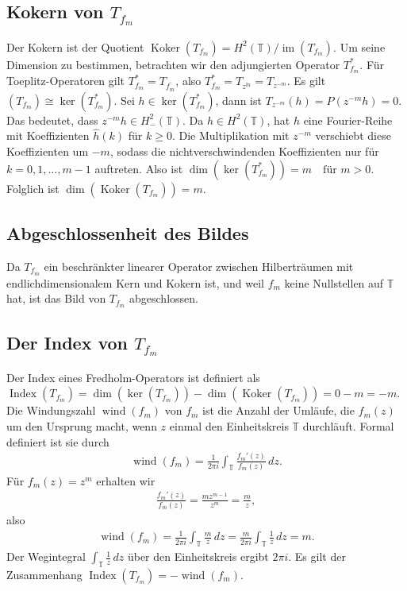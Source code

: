 \documentclass[11pt, hidelinks]{article}
\numberwithin{conj}{section}
\begin{document}
\subsection{Kokern von \( T_{f_m} \)}
Der Kokern ist der Quotient $\operatorname{Koker}(T_{f_m}) = H^2(\mathbb{T}) / \operatorname{im}(T_{f_m})$. Um seine Dimension zu bestimmen, betrachten wir den adjungierten Operator \( T_{f_m}^* \). Für Toeplitz-Operatoren gilt \( T_{f_m}^* = T_{\overline{f_m}} \), also $T_{f_m}^* = T_{\overline{z^m}} = T_{z^{-m}}$. Es gilt $(T_{f_m}) \cong \ker(T_{f_m}^*)$. Sei \( h \in \ker(T_{f_m}^*) \), dann ist $T_{z^{-m}}(h) = P(z^{-m} h) = 0$. Das bedeutet, dass \( z^{-m} h \in H^2_-(\mathbb{T}) \). Da \( h \in H^2(\mathbb{T}) \), hat \( h \) eine Fourier-Reihe mit Koeffizienten \( \hat{h}(k) \) für \( k \geq 0 \). Die Multiplikation mit \( z^{-m} \) verschiebt diese Koeffizienten um \( -m \), sodass die nichtverschwindenden Koeffizienten nur für \( k = 0, 1, \ldots, m - 1 \) auftreten. Also ist $\dim(\ker(T_{f_m}^*)) = m \quad \text{für } m > 0$. Folglich ist $\dim(\operatorname{Koker}(T_{f_m})) = m$.

\subsection{Abgeschlossenheit des Bildes}
Da \( T_{f_m} \) ein beschränkter linearer Operator zwischen Hilberträumen mit endlichdimensionalem Kern und Kokern ist, und weil \( f_m \) keine Nullstellen auf \( \mathbb{T} \) hat, ist das Bild von \( T_{f_m} \) abgeschlossen.

\subsection{Der Index von \( T_{f_m} \)}
Der Index eines Fredholm-Operators ist definiert als $\operatorname{Index}(T_{f_m}) = \dim(\ker(T_{f_m})) - \dim(\operatorname{Koker}(T_{f_m})) = 0 - m = -m$. Die Windungszahl \( \operatorname{wind}(f_m) \) von \( f_m \) ist die Anzahl der Umläufe, die \( f_m(z) \) um den Ursprung macht, wenn \( z \) einmal den Einheitskreis \( \mathbb{T} \) durchläuft. Formal definiert ist sie durch
\begin{align}
    \operatorname{wind}(f_m) = \frac{1}{2\pi i} \int_{\mathbb{T}} \frac{f_m'(z)}{f_m(z)} \, dz.
\end{align}
Für \( f_m(z) = z^m \) erhalten wir
\begin{align}
    \frac{f_m'(z)}{f_m(z)} = \frac{m z^{m-1}}{z^m} = \frac{m}{z},
\end{align}
also
\begin{align}
\operatorname{wind}(f_m) = \frac{1}{2\pi i} \int_{\mathbb{T}} \frac{m}{z} \, dz = \frac{m}{2\pi i} \int_{\mathbb{T}} \frac{1}{z} \, dz = m.
\end{align}
Der Wegintegral \(\int_{\mathbb{T}} \frac{1}{z} \, dz\) über den Einheitskreis ergibt \( 2\pi i \). Es gilt der Zusammenhang $\operatorname{Index}(T_{f_m}) = -\operatorname{wind}(f_m)$.

\singlespacing
\nocite{*}


\end{document}

